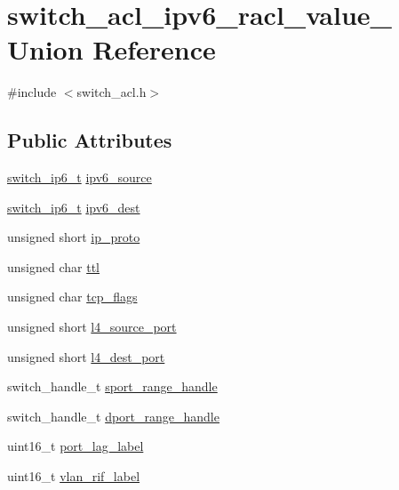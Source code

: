 \hypertarget{unionswitch__acl__ipv6__racl__value__}{\section{switch\+\_\+acl\+\_\+ipv6\+\_\+racl\+\_\+value\+\_\+ Union Reference}
\label{unionswitch__acl__ipv6__racl__value__}
}


{\ttfamily \#include $<$switch\+\_\+acl.\+h$>$}

\subsection*{Public Attributes}
\begin{DoxyCompactItemize}
\item 
\hyperlink{structswitch__uint128__t}{switch\+\_\+ip6\+\_\+t} \hyperlink{unionswitch__acl__ipv6__racl__value___a93fa7af69a65cd05b170054b55facbdc}{ipv6\+\_\+source}
\item 
\hyperlink{structswitch__uint128__t}{switch\+\_\+ip6\+\_\+t} \hyperlink{unionswitch__acl__ipv6__racl__value___adfeca593797b13b77686ee304f1d4204}{ipv6\+\_\+dest}
\item 
unsigned short \hyperlink{unionswitch__acl__ipv6__racl__value___aed47aec3943c40b370dfe8bb4119277e}{ip\+\_\+proto}
\item 
unsigned char \hyperlink{unionswitch__acl__ipv6__racl__value___aa998e01c56d4a83f168b3cce8aa390a7}{ttl}
\item 
unsigned char \hyperlink{unionswitch__acl__ipv6__racl__value___a544c225ca157a35bea87bde9448b0b5a}{tcp\+\_\+flags}
\item 
unsigned short \hyperlink{unionswitch__acl__ipv6__racl__value___ae815c154bdfe06464bc946e7674a36af}{l4\+\_\+source\+\_\+port}
\item 
unsigned short \hyperlink{unionswitch__acl__ipv6__racl__value___ac0251773078678e102257534c380c985}{l4\+\_\+dest\+\_\+port}
\item 
switch\+\_\+handle\+\_\+t \hyperlink{unionswitch__acl__ipv6__racl__value___a7c2c1b519b8d294255df4fdb0f669830}{sport\+\_\+range\+\_\+handle}
\item 
switch\+\_\+handle\+\_\+t \hyperlink{unionswitch__acl__ipv6__racl__value___a6a93fe1bc90f91ca2ef0356b49933520}{dport\+\_\+range\+\_\+handle}
\item 
uint16\+\_\+t \hyperlink{unionswitch__acl__ipv6__racl__value___a756fc1c5a205ec4ae1e1b694fa5c0a2b}{port\+\_\+lag\+\_\+label}
\item 
uint16\+\_\+t \hyperlink{unionswitch__acl__ipv6__racl__value___af300c50a29cb1f6ddcce5d703914cfee}{vlan\+\_\+rif\+\_\+label}
\end{DoxyCompactItemize}



